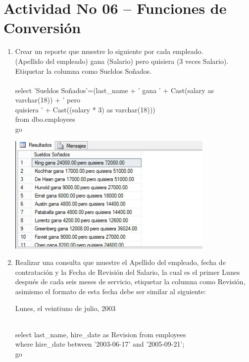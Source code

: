 \section{Actividad No 06 – Funciones de Conversi\'on} 
		
\begin{enumerate}[1.]
	\item Crear un reporte que muestre lo siguiente por cada empleado.
	\\(Apellido del empleado) gana (Salario) pero quisiera (3 veces Salario).
	\\Etiquetar la columna como Sueldos Soñados.
	\\
	\\select 'Sueldos Soñados'=(last\_name + ' gana ' + Cast(salary as varchar(18)) + ' pero 
	\\quisiera ' + Cast((salary * 3) as varchar(18))) 
	\\from dbo.employees
	\\go
	\\
	\begin{center}
	\includegraphics[width=10cm]{./Imagenes/img01} 
	\end{center}

	\item Realizar una consulta que muestre el Apellido del empleado, fecha de contratación y la Fecha de Revisión del Salario, la cual es el primer Lunes después de cada seis meses de servicio, etiquetar la columna como Revisión, asimismo el formato de esta fecha debe ser similar al siguiente: 
	\begin{center}
	Lunes, el veintiuno de julio, 2003 
	\end{center}
\
	\\select last\_name, hire\_date as Revision from employees 
	\\where hire\_date between '2003-06-17' and '2005-09-21';
	\\go
	

\end{enumerate}
